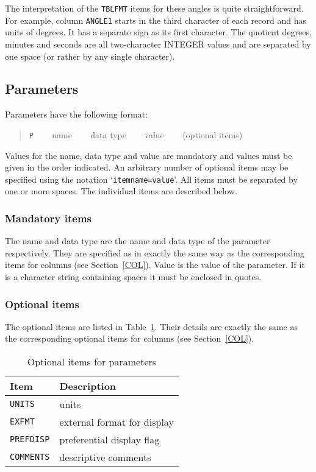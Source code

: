 \documentclass[twoside,11pt]{article}
\renewcommand{\_}{\texttt{\symbol{95}}}
\begin{document}
The interpretation of the {\tt TBLFMT} items for these angles is quite
straightforward.  For example, column {\tt ANGLE1} starts in the third
character of each record and has units of degrees.  It has a separate
sign as its first character.  The quotient degrees, minutes and
seconds are all two-character INTEGER values and are separated by
one space (or rather by any single character).

\subsection{Parameters \label{PAR}}

Parameters have the following format:

\begin{quote}
{\tt P} ~~~ name ~~~ data type ~~~ value ~~~ (optional items)
\end{quote}

Values for the name, data type and value are mandatory and values
must be given in the order indicated.  An arbitrary number of optional
items may be specified using the notation `{\tt item\_name=value}'.
All items must be separated by one or more spaces.  The individual
items are described below.

\subsubsection{Mandatory items}

The name and data type are the name and data type of the parameter
respectively.  They are specified as in exactly the same way as the
corresponding items for columns (see Section~\ref{COL}).  Value is the
value of the parameter.  If it is a character string containing spaces
it must be enclosed in quotes.

\subsubsection{Optional items}

The optional items are listed in Table~\ref{PAR_OPT}. Their details
are exactly the same as the corresponding optional items for columns
(see Section~\ref{COL}).

\begin{table}[htbp]

\begin{center}
\begin{tabular}{ll}
Item           & Description                   \\ \hline
{\tt UNITS}    & units                         \\
{\tt EXFMT}    & external format for display   \\
{\tt PREFDISP} & preferential display flag     \\
{\tt COMMENTS} & descriptive comments          \\
\end{tabular}

\caption{Optional items for parameters \label{PAR_OPT} }

\end{center}
\end{table}
\end{document}
